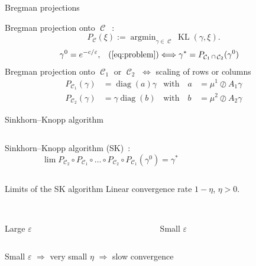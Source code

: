 \documentclass[compress]{beamer}
\DeclareMathOperator*{\argmin}{argmin}
\DeclareMathOperator{\Ccal}{\mathcal{C}}
\DeclareMathOperator{\diag}{diag}
\DeclareMathOperator{\KL}{KL}
\renewcommand{\epsilon}{\varepsilon}
\begin{document}
\begin{frame}{Bregman projections}
	
Bregman projection onto $\Ccal$~:
\[
P_{\Ccal}(\xi) := \argmin_{\gamma \in \Ccal} \KL(\gamma,\xi).
\]
\pause
\begin{align*}
\gamma^0 &= e^{-c/\epsilon},&
\text{(\ref{eq:problem})} \Longleftrightarrow
\gamma^* &= P_{\Ccal_1 \cap \Ccal_2}(\gamma^0)
\end{align*}
\pause
Bregman projection onto $\Ccal_1$ or $\Ccal_2$ $\Longleftrightarrow$ scaling of rows or columns
\begin{align*}\label{scaling}
P_{\Ccal_1}(\gamma) &= \diag(a) \gamma &\text{with}\quad
a &=  {\mu^1}\oslash{A_1 \gamma} \\
P_{\Ccal_2}(\gamma) &= \gamma \diag(b) &\text{with}\quad
b &= {\mu^2}\oslash{A_2 \gamma}\nonumber
\end{align*}

\end{frame}

\begin{frame}{Sinkhorn--Knopp algorithm}
	
	\begin{columns}
	\begin{column}{0.6\textwidth}

	Sinkhorn--Knopp algorithm (SK)~:
	\[
	\lim P_{\Ccal_2}\circ P_{\Ccal_1} \circ \ldots \circ P_{\Ccal_2} \circ P_{\Ccal_1} (\gamma^0) = \gamma^*
	\]
	
\end{column}

\begin{column}{0.4\textwidth}
	\centering
	
\end{column}
\end{columns}
\end{frame}

\begin{frame}{Limits of the SK algorithm}
Linear convergence rate $1-\eta$, $\eta > 0$.

\begin{columns}
	\begin{column}{0.5\textwidth}
		\centering
		\\
		Large $\epsilon$
	\end{column}
	\begin{column}{0.5\textwidth}
		\centering
		\\
		Small $\epsilon$
	\end{column}
\end{columns}

Small $\epsilon$ $\Longrightarrow$
very small $\eta$ $\Longrightarrow$
slow convergence
\end{frame}
\end{document}
